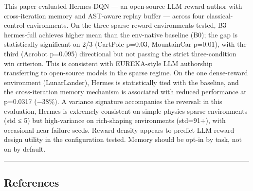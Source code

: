 This paper evaluated Hermes-DQN --- an open-source LLM reward author with cross-iteration memory and AST-aware replay buffer --- across four classical-control environments. On the three sparse-reward environments tested, B3-hermes-full achieves higher mean than the env-native baseline (B0); the gap is statistically significant on 2/3 (CartPole p=0.03, MountainCar p=0.01), with the third (Acrobot p=0.095) directional but not passing the strict three-condition win criterion. This is consistent with EUREKA-style LLM authorship transferring to open-source models in the sparse regime. On the one dense-reward environment (LunarLander), Hermes is statistically tied with the baseline, and the cross-iteration memory mechanism is associated with reduced performance at p=0.0317 (−38\%). A variance signature accompanies the reversal: in this evaluation, Hermes is extremely consistent on simple-physics sparse environments (std ≤ 5) but high-variance on rich-shaping environments (std=91+), with occasional near-failure seeds. Reward density appears to predict LLM-reward-design utility in the configuration tested. Memory should be opt-in by task, not on by default.

\begin{center}\rule{0.5\linewidth}{0.5pt}\end{center}

\subsection{References}\label{references}

